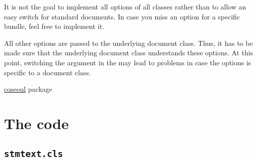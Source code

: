 \documentclass[%
  type=article,%
  layout=koma,%
  page=false,%
  cleveref=true,%
  conditionallox=true,%
  conditionalloxnewpage=true,%
  date=true,%
  glossaries=true,%
  hyperref=true,%
  index=true,%
  listings=true%
]{stmtext}
\begin{document}
It is not the goal to implement all options of all classes rather than to allow an easy switch for standard documents. In case you miss an option for a specific bundle, feel free to implement it.






% 


All other options are passed to the underlying document class. Thus, it has to be made sure that the underlying document class understands these options. At this point, switching the argument in the  may lead to problems in case the options is specific to a document class.

\setcounter{currentlevel}{\basetoclevelnr}
\label{sec:usage}


\href{https://ctan.org/tex-archive/macros/latex/contrib/coseoul}{coseoul} package

\printstmacronyms

\printstmindex

\newpage
\appendix

\section{The code}

\subsection{\protect\texttt{stmtext.cls}}


\end{document}
